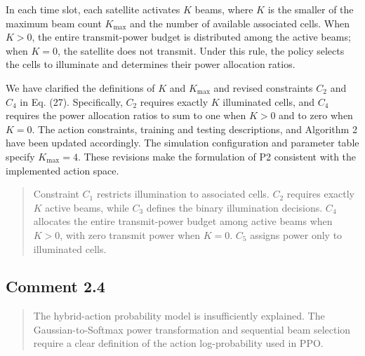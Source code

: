 \documentclass[11pt,a4paper]{article}
\begin{document}
In each time slot, each satellite activates $K$ beams, where $K$ is the smaller of the maximum beam count $K_{\max}$ and the number of available associated cells. When $K>0$, the entire transmit-power budget is distributed among the active beams; when $K=0$, the satellite does not transmit. Under this rule, the policy selects the cells to illuminate and determines their power allocation ratios.
\par

We have clarified the definitions of $K$ and $K_{\max}$ and revised constraints $C_2$ and $C_4$ in Eq. (27). Specifically, $C_2$ requires exactly $K$ illuminated cells, and $C_4$ requires the power allocation ratios to sum to one when $K>0$ and to zero when $K=0$. The action constraints, training and testing descriptions, and Algorithm 2 have been updated accordingly. The simulation configuration and parameter table specify $K_{\max}=4$. These revisions make the formulation of P2 consistent with the implemented action space.
\par


\begin{quote}\small\color{revisionblue}
Constraint $C_1$ restricts illumination to associated cells. $C_2$ requires exactly $K$ active beams, while $C_3$ defines the binary illumination decisions. $C_4$ allocates the entire transmit-power budget among active beams when $K>0$, with zero transmit power when $K=0$. $C_5$ assigns power only to illuminated cells.
\par
\end{quote}


\subsection*{Comment 2.4}

\begin{quote}\small The hybrid-action probability model is insufficiently explained. The Gaussian-to-Softmax power transformation and sequential beam selection require a clear definition of the action log-probability used in PPO.\end{quote}
\end{document}
